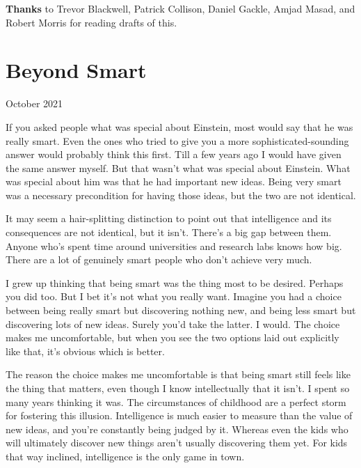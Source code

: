 \documentclass[12pt]{book}
\begin{document}
\textbf{Thanks} to Trevor Blackwell, Patrick Collison, Daniel Gackle,
Amjad Masad, and Robert Morris for reading drafts of this.
\chapter{Beyond Smart}

October 2021

If you asked people what was special about Einstein, most would say that
he was really smart. Even the ones who tried to give you a more
sophisticated-sounding answer would probably think this first. Till a
few years ago I would have given the same answer myself. But that wasn't
what was special about Einstein. What was special about him was that he
had important new ideas. Being very smart was a necessary precondition
for having those ideas, but the two are not identical.

It may seem a hair-splitting distinction to point out that intelligence
and its consequences are not identical, but it isn't. There's a big gap
between them. Anyone who's spent time around universities and research
labs knows how big. There are a lot of genuinely smart people who don't
achieve very much.

I grew up thinking that being smart was the thing most to be desired.
Perhaps you did too. But I bet it's not what you really want. Imagine
you had a choice between being really smart but discovering nothing new,
and being less smart but discovering lots of new ideas. Surely you'd
take the latter. I would. The choice makes me uncomfortable, but when
you see the two options laid out explicitly like that, it's obvious
which is better.

The reason the choice makes me uncomfortable is that being smart still
feels like the thing that matters, even though I know intellectually
that it isn't. I spent so many years thinking it was. The circumstances
of childhood are a perfect storm for fostering this illusion.
Intelligence is much easier to measure than the value of new ideas, and
you're constantly being judged by it. Whereas even the kids who will
ultimately discover new things aren't usually discovering them yet. For
kids that way inclined, intelligence is the only game in town.
\end{document}
